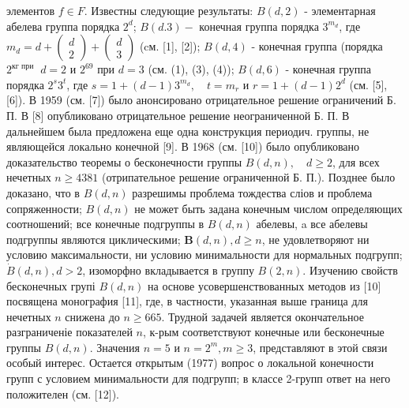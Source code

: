 \documentclass[10pt]{article}
\begin{document}
элементов $f \in F$. Известны следующие результаты: $B(d, 2)$ - элементарная абелева группа порядка $2^{d}$; $B(d .3)-$ конечная группа порядка $3^{m_{d}}$, где $m_{d}=d+\left(\begin{array}{c}d \\ 2\end{array}\right)+\left(\begin{array}{c}d \\ 3\end{array}\right)$ (cм. [1], [2]); $B(d, 4)$ - конечная группа (порядка $2^{\text {кг при }}$ $d=2$ и $2^{69}$ при $d=3$ (см. (1), (3), (4)); $B(d, 6)$ - конечная группа порядка $2^{s} 3^{t}$, где $s=1+(d-1) 3^{m_{d}}, \quad t=m_{r}$ и $r=1+(d-1) 2^{d}$ (см. [5],[6]). В 1959 (см. [7]) было анонсировано отрицательное решение ограничений Б. П. В [8] опубликовано отрицательное решение неограниченной Б. П. В дальнейшем была предложена еще одна конструкция периодич. группы, не являющейся локально конечной [9]. В 1968 (см. [10]) было опубликовано доказательство теоремы о бесконечности группы $B(d, n), \quad d \geqslant 2$, для всех нечетных $n \geqslant 4381$ (отрипательное решение ограниченной Б. П.). Позднее было доказано, что в $B(d, n)$ разрешимы проблема тождества сліов и проблема сопряженности; $B(d, n)$ не может быть задана конечным числом определяющих соотношений; все конечные подгруппы в $B(d, n)$ абелевы, a все абелевы подгруппы являются циклическими; $\boldsymbol{B}(d, n), d \geqslant n$, не удовлетворяют ни условию максимальности, ни условию минимальности для нормальных подгрупп; $\dot{B}(d, n), d>2$, изоморфно вкладывается в группу $B(2, n)$. Изучению свойств бесконечных групі $B(d, n)$ на основе усовершенствованных методов из [10] посвящена монография [11], где, в частности, указанная выше граница для нечетных $n$ снижена до $n \geqslant 665$. Трудной задачей является окончательное разграниченіе показателей $n$, к-рым соответствуют конечные или бесконечные группы $B(d, n)$. Значения $n=5$ и $n=2^{m}, m \geqslant 3$, представляют в этой связи особый интерес. Остается открытым (1977) вопрос о локальной конечности групп с условием минимальности для подгрупп; в классе 2-групп ответ на него положителен (см. [12]).
\end{document}
